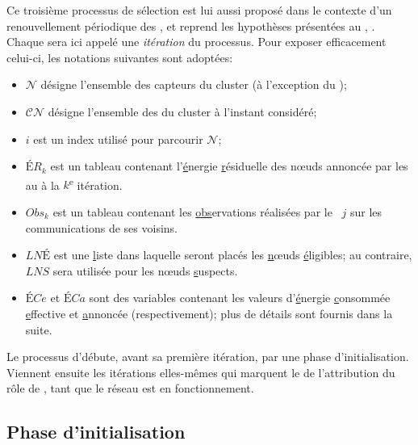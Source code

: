 Ce troisième processus de sélection est lui aussi proposé dans le contexte d'un renouvellement périodique des \cns, et reprend les hypothèses présentées au , .
Chaque  sera ici appelé une \emph{itération} du processus.
Pour exposer efficacement celui-ci, les notations suivantes sont adoptées:
\begin{itemize}
    \item $\mathcal{N}$ désigne l'ensemble des capteurs du cluster (à l'exception du \ch);
    \item $\mathcal{CN}$ désigne l'ensemble des \cns du cluster à l'instant considéré;
    \item $i$ est un index utilisé pour parcourir $\mathcal{N}$;
    \item $\mathit{ÉR}_k$ est un tableau contenant l'\underline{é}nergie \underline{r}ésiduelle des nœuds annoncée par les \cns au \ch à la $k$\textsuperscript{e} itération.
    \item $\mathit{Obs}_k$ est un tableau contenant les \underline{obs}ervations réalisées par le \cn~$j$ sur les communications de ses voisins.
    \item $\mathit{LNÉ}$ est une \underline{l}iste dans laquelle seront placés les \underline{n}œuds \underline{é}ligibles; au contraire, $\mathit{LNS}$ sera utilisée pour les nœuds \underline{s}uspects.
    \item $\mathit{ÉCe}$ et $\mathit{ÉCa}$ sont des variables contenant les valeurs d'\underline{é}nergie \underline{c}onsommée \underline{e}ffec\-tive et \underline{a}nnoncée (respectivement); plus de détails sont fournis dans la suite.
\end{itemize}

Le processus d'\election débute, avant sa première itération, par une phase d'initialisation.
Viennent ensuite les itérations elles-mêmes qui marquent le  de l'attribution du rôle de \cn, tant que le réseau est en fonctionnement.

    \subsection{Phase d'initialisation}

